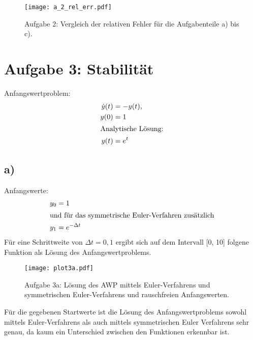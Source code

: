 \begin{figure}[h]
    \centering
    \texttt{[image: a\_2\_rel\_err.pdf]}
    \caption{Aufgabe 2: Vergleich der relativen Fehler für die Aufgabenteile a) bis c).}
    \label{fig:plot2_err}
\end{figure}
\FloatBarrier

\section*{Aufgabe 3: Stabilität}
Anfangswertproblem:
\begin{align*}
  \dot{y}(t)&=-y(t), \\ y(0)&=1 \\
  \intertext{Analytische Lösung:} y(t)&=e^{t}
\end{align*}

\subsection*{a)}
Anfangswerte:
\begin{align*}
  y_0&=1\\
  \intertext{und für das symmetrische Euler-Verfahren zusätzlich}
  y_1&=e^{-\Delta t}
\end{align*}
Für eine Schrittweite von $\Delta t = 0,1$ ergibt sich auf dem Intervall [0, 10] folgene Funktion als Lösung des Anfangswertproblems.
\FloatBarrier
\begin{figure}[h]
    \centering
    \texttt{[image: plot3a.pdf]}
    \caption{Aufgabe 3a: Lösung des AWP mittels Euler-Verfahrens und symmetrischen Euler-Verfahrens und rauschfreien Anfangswerten.}
    \label{fig:plot3a}
\end{figure}
\FloatBarrier
Für die gegebenen Startwerte ist die Lösung des Anfangswertproblems sowohl mittels Euler-Verfahrens als auch mittels symmetrischen Euler Verfahrens sehr genau, da kaum ein Unterschied zwischen den Funktionen erkennbar ist.

